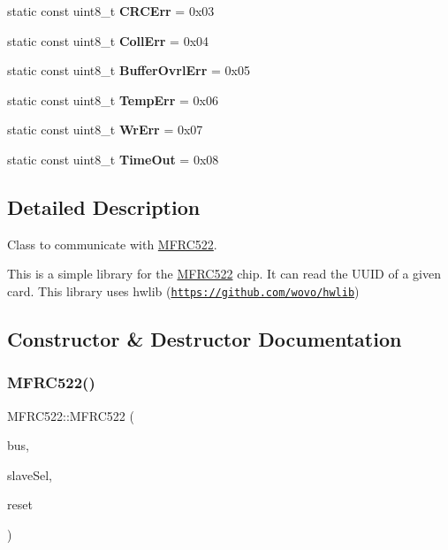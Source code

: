 \begin{DoxyCompactItemize}
static const uint8\+\_\+t {\bfseries C\+R\+C\+Err} = 0x03
\item 
\mbox{\label{classMFRC522_afebf0772f64954ce203b4140b5db09fd}} 
static const uint8\+\_\+t {\bfseries Coll\+Err} = 0x04
\item 
\mbox{\label{classMFRC522_a3ff93285d827a9d20914470bf6c284ab}} 
static const uint8\+\_\+t {\bfseries Buffer\+Ovrl\+Err} = 0x05
\item 
\mbox{\label{classMFRC522_a8ba339caf47ffbfef993542df5109023}} 
static const uint8\+\_\+t {\bfseries Temp\+Err} = 0x06
\item 
\mbox{\label{classMFRC522_a2b9f725730e12abdf9f50f78b297a0ff}} 
static const uint8\+\_\+t {\bfseries Wr\+Err} = 0x07
\item 
\mbox{\label{classMFRC522_a64932294752fa585ccce83f181a32422}} 
static const uint8\+\_\+t {\bfseries Time\+Out} = 0x08
\end{DoxyCompactItemize}


\subsection{Detailed Description}
Class to communicate with \hyperlink{classMFRC522}{M\+F\+R\+C522}. 

This is a simple library for the \hyperlink{classMFRC522}{M\+F\+R\+C522} chip. It can read the U\+U\+ID of a given card. This library uses hwlib (\href{https://github.com/wovo/hwlib}{\tt https\+://github.\+com/wovo/hwlib}) 

\subsection{Constructor \& Destructor Documentation}
\mbox{\label{classMFRC522_a941f62373024077506c43cc67e73f6ae}} 
\subsubsection{\texorpdfstring{M\+F\+R\+C522()}{MFRC522()}}
{\footnotesize\ttfamily M\+F\+R\+C522\+::\+M\+F\+R\+C522 (\begin{DoxyParamCaption}\item[{\hyperlink{classspiSetup}{spi\+Setup} \&}]{bus,  }\item[{hwlib\+::pin\+\_\+out \&}]{slave\+Sel,  }\item[{hwlib\+::pin\+\_\+out \&}]{reset }\end{DoxyParamCaption})}



